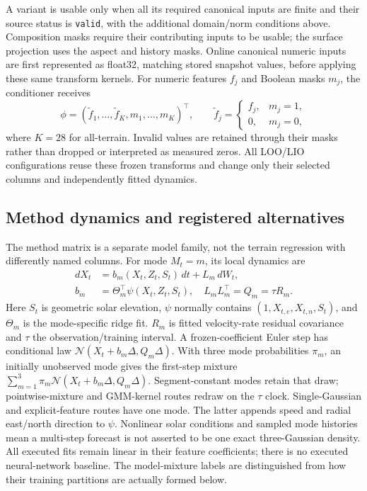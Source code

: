\documentclass[11pt]{article}
\begin{document}
A variant is usable only when all its required canonical inputs are finite
and their source status is \texttt{valid}, with the additional domain/norm
conditions above. Composition masks require their contributing inputs to be
usable; the surface projection uses the aspect and history masks. Online
canonical numeric inputs are first represented as float32, matching stored
snapshot values, before applying these same transform kernels. For numeric
features \(f_j\) and Boolean masks \(m_j\), the conditioner receives
\begin{equation}
 \phi=(\widetilde f_1,\ldots,\widetilde f_K,m_1,\ldots,m_K)^\top,
 \qquad \widetilde f_j=
 \begin{cases}f_j,&m_j=1,\\0,&m_j=0,\end{cases}
 \label{eq:feature-masks}
\end{equation}
where \(K=28\) for all-terrain. Invalid values are retained through their
masks rather than dropped or interpreted as measured zeros. All LOO/LIO
configurations reuse these frozen transforms and change only their selected
columns and independently fitted dynamics.

\subsection{Method dynamics and registered alternatives}
\label{sec:method-model}
The method matrix is a separate model family, not the terrain regression
with differently named columns. For mode \(M_t=m\), its local dynamics are
\begin{equation}
 \begin{aligned}
 dX_t&=b_m(X_t,Z_t,S_t)\,dt+L_m\,dW_t,\\
 b_m&=\Theta_m^\top\psi(X_t,Z_t,S_t),\quad L_mL_m^\top=Q_m=\tau R_m.
 \end{aligned}
 \label{eq:method-sde}
\end{equation}
Here \(S_t\) is geometric solar elevation, \(\psi\) normally contains
\((1,X_{t,e},X_{t,n},S_t)\), and \(\Theta_m\) is the mode-specific ridge fit.
\(R_m\) is fitted velocity-rate residual covariance and \(\tau\) the
observation/training interval. A frozen-coefficient Euler step has conditional
law \(\mathcal N(X_t+b_m\Delta,Q_m\Delta)\).
With three mode probabilities \(\pi_m\), an initially unobserved mode gives
the first-step mixture \(\sum_{m=1}^3\pi_m\mathcal N(X_t+b_m\Delta,Q_m\Delta)\).
Segment-constant modes retain that draw; pointwise-mixture and GMM-kernel
routes redraw on the \(\tau\) clock. Single-Gaussian and explicit-feature
routes have one mode. The latter appends speed and radial east/north direction
to \(\psi\). Nonlinear solar conditions and sampled mode histories mean a
multi-step forecast is not asserted to be one exact three-Gaussian density.
All executed fits remain linear in their feature coefficients; there is no
executed neural-network baseline. The model-mixture labels are distinguished
from how their training partitions are actually formed below.
\end{document}
